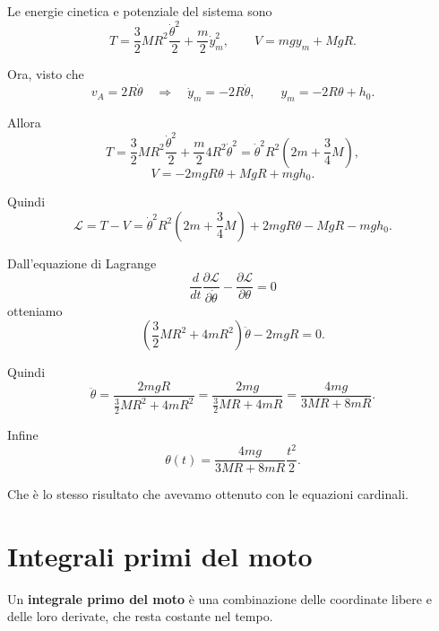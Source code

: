 \begin{example}{}
\begin{center}
\begin{tikzpicture}[scale=1.15,>=latex]
\end{tikzpicture}
\end{center}
Le energie cinetica e potenziale del sistema sono
\[
T
=
\frac{3}{2}MR^2\frac{\dot{\theta}^2}{2}
+
\frac{m}{2}\dot{y}_m^2,
\qquad
V
=
mg y_m + MgR.
\]

Ora, visto che
\[
v_A = 2R\dot{\theta}
\quad \Longrightarrow \quad
\dot{y}_m = -2R\dot{\theta},
\qquad
y_m = -2R\theta + h_0.
\]

Allora
\[
T
=
\frac{3}{2}MR^2\frac{\dot{\theta}^2}{2}
+
\frac{m}{2}4R^2\dot{\theta}^2
=
\dot{\theta}^2R^2
\left(
2m+\frac{3}{4}M
\right),
\]
\[
V
=
-2mgR\theta + MgR + mgh_0.
\]

Quindi
\[
\mathcal{L}
=
T - V
=
\dot{\theta}^2R^2
\left(
2m+\frac{3}{4}M
\right)
+
2mgR\theta
-
MgR
-
mgh_0.
\]

Dall'equazione di Lagrange
\[
\frac{d}{dt}
\frac{\partial \mathcal{L}}{\partial \dot{\theta}}
-
\frac{\partial \mathcal{L}}{\partial \theta}
=
0
\]
otteniamo
\[
\left(
\frac{3}{2}MR^2 + 4mR^2
\right)\ddot{\theta}
-
2mgR
=
0.
\]

Quindi
\[
\ddot{\theta}
=
\frac{2mgR}{\frac{3}{2}MR^2+4mR^2}
=
\frac{2mg}{\frac{3}{2}MR+4mR}
=
\frac{4mg}{3MR+8mR}.
\]

Infine
\[
\theta(t)
=
\frac{4mg}{3MR+8mR}
\frac{t^2}{2}.
\]

Che è lo stesso risultato che avevamo ottenuto con le equazioni cardinali.
\end{example}


\section{Integrali primi del moto}

\begin{definition}{}
Un \textbf{integrale primo del moto} è una combinazione delle coordinate libere e delle loro derivate, che resta costante nel tempo.
\end{definition}

